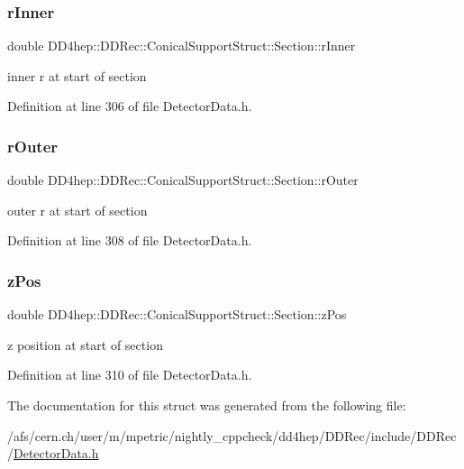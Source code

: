\subsubsection{\texorpdfstring{r\+Inner}{rInner}}
{\footnotesize\ttfamily double D\+D4hep\+::\+D\+D\+Rec\+::\+Conical\+Support\+Struct\+::\+Section\+::r\+Inner}



inner r at start of section 



Definition at line 306 of file Detector\+Data.\+h.

\hypertarget{struct_d_d4hep_1_1_d_d_rec_1_1_conical_support_struct_1_1_section_a2bf73928a0b64cdbc0b58f724c90126a}{}\label{struct_d_d4hep_1_1_d_d_rec_1_1_conical_support_struct_1_1_section_a2bf73928a0b64cdbc0b58f724c90126a} 
\subsubsection{\texorpdfstring{r\+Outer}{rOuter}}
{\footnotesize\ttfamily double D\+D4hep\+::\+D\+D\+Rec\+::\+Conical\+Support\+Struct\+::\+Section\+::r\+Outer}



outer r at start of section 



Definition at line 308 of file Detector\+Data.\+h.

\hypertarget{struct_d_d4hep_1_1_d_d_rec_1_1_conical_support_struct_1_1_section_a078b08f486bacca5f6de87ac1bba2b97}{}\label{struct_d_d4hep_1_1_d_d_rec_1_1_conical_support_struct_1_1_section_a078b08f486bacca5f6de87ac1bba2b97} 
\subsubsection{\texorpdfstring{z\+Pos}{zPos}}
{\footnotesize\ttfamily double D\+D4hep\+::\+D\+D\+Rec\+::\+Conical\+Support\+Struct\+::\+Section\+::z\+Pos}



z position at start of section 



Definition at line 310 of file Detector\+Data.\+h.



The documentation for this struct was generated from the following file\+:\begin{DoxyCompactItemize}
\item 
/afs/cern.\+ch/user/m/mpetric/nightly\+\_\+cppcheck/dd4hep/\+D\+D\+Rec/include/\+D\+D\+Rec/\hyperlink{_detector_data_8h}{Detector\+Data.\+h}\end{DoxyCompactItemize}
